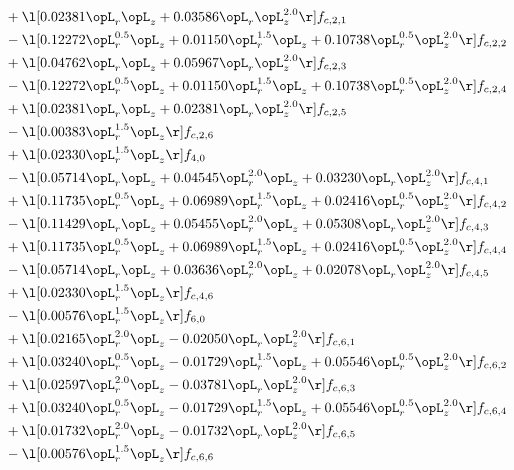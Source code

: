\begin{alignat}{2}
& + \l[  0.02381 \opL_r \opL_z +  0.03586 \opL_r \opL_z^{2.0}  \r] f_{c,2,1} \nonumber \\ 
& - \l[  0.12272 \opL_r^{0.5} \opL_z +  0.01150 \opL_r^{1.5} \opL_z +  0.10738 \opL_r^{0.5} \opL_z^{2.0}  \r] f_{c,2,2} \nonumber \\ 
& + \l[  0.04762 \opL_r \opL_z +  0.05967 \opL_r \opL_z^{2.0}  \r] f_{c,2,3} \nonumber \\ 
& - \l[  0.12272 \opL_r^{0.5} \opL_z +  0.01150 \opL_r^{1.5} \opL_z +  0.10738 \opL_r^{0.5} \opL_z^{2.0}  \r] f_{c,2,4} \nonumber \\ 
& + \l[  0.02381 \opL_r \opL_z +  0.02381 \opL_r \opL_z^{2.0}  \r] f_{c,2,5} \nonumber \\ 
& - \l[  0.00383 \opL_r^{1.5} \opL_z  \r] f_{c,2,6} \nonumber \\ 
& + \l[  0.02330 \opL_r^{1.5} \opL_z  \r] f_{4,0} \nonumber \\ 
& - \l[  0.05714 \opL_r \opL_z +  0.04545 \opL_r^{2.0} \opL_z +  0.03230 \opL_r \opL_z^{2.0}  \r] f_{c,4,1} \nonumber \\ 
& + \l[  0.11735 \opL_r^{0.5} \opL_z +  0.06989 \opL_r^{1.5} \opL_z +  0.02416 \opL_r^{0.5} \opL_z^{2.0}  \r] f_{c,4,2} \nonumber \\ 
& - \l[  0.11429 \opL_r \opL_z +  0.05455 \opL_r^{2.0} \opL_z +  0.05308 \opL_r \opL_z^{2.0}  \r] f_{c,4,3} \nonumber \\ 
& + \l[  0.11735 \opL_r^{0.5} \opL_z +  0.06989 \opL_r^{1.5} \opL_z +  0.02416 \opL_r^{0.5} \opL_z^{2.0}  \r] f_{c,4,4} \nonumber \\ 
& - \l[  0.05714 \opL_r \opL_z +  0.03636 \opL_r^{2.0} \opL_z +  0.02078 \opL_r \opL_z^{2.0}  \r] f_{c,4,5} \nonumber \\ 
& + \l[  0.02330 \opL_r^{1.5} \opL_z  \r] f_{c,4,6} \nonumber \\ 
& - \l[  0.00576 \opL_r^{1.5} \opL_z  \r] f_{6,0} \nonumber \\ 
& + \l[  0.02165 \opL_r^{2.0} \opL_z   -0.02050 \opL_r \opL_z^{2.0}  \r] f_{c,6,1} \nonumber \\ 
& + \l[  0.03240 \opL_r^{0.5} \opL_z   -0.01729 \opL_r^{1.5} \opL_z +  0.05546 \opL_r^{0.5} \opL_z^{2.0}  \r] f_{c,6,2} \nonumber \\ 
& + \l[  0.02597 \opL_r^{2.0} \opL_z   -0.03781 \opL_r \opL_z^{2.0}  \r] f_{c,6,3} \nonumber \\ 
& + \l[  0.03240 \opL_r^{0.5} \opL_z   -0.01729 \opL_r^{1.5} \opL_z +  0.05546 \opL_r^{0.5} \opL_z^{2.0}  \r] f_{c,6,4} \nonumber \\ 
& + \l[  0.01732 \opL_r^{2.0} \opL_z   -0.01732 \opL_r \opL_z^{2.0}  \r] f_{c,6,5} \nonumber \\ 
& - \l[  0.00576 \opL_r^{1.5} \opL_z  \r] f_{c,6,6} \nonumber \\ 
\end{alignat} 


